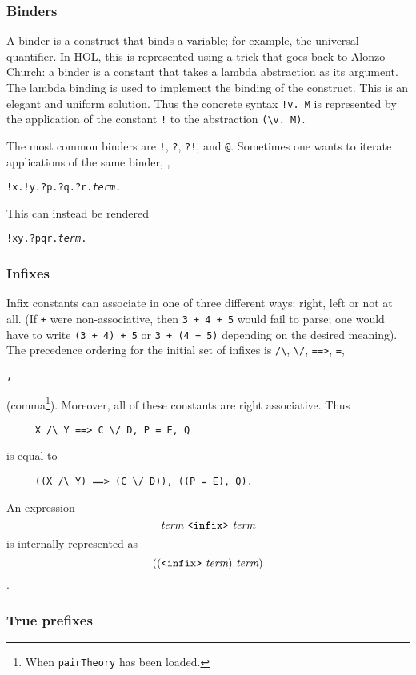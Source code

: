 \documentclass[12pt,fleqn,a4paper]{report}
\newcommand{\term}       {\mbox{\it term}}
\begin{document}
\subsubsection{Binders}

A binder is a construct that binds a variable; for example, the
universal quantifier. In HOL, this is represented using a trick that
goes back to Alonzo Church: a binder is a constant that takes a lambda
abstraction as its argument. The lambda binding is used to implement
the binding of the construct. This is an elegant and uniform solution.
Thus the concrete syntax \verb+!v. M+ is represented by the
application of the constant \verb+!+ to the abstraction \verb+(\v. M)+.

The most common binders are \verb+!+, \verb+?+, \verb+?!+, and
\verb+@+. Sometimes one wants to iterate applications of the same
binder, \eg,
\begin{alltt}
  !x. !y. ?p. ?q. ?r. \term.
\end{alltt}
This can instead be rendered
\begin{alltt}
  !x y. ?p q r. \term.
\end{alltt}

\subsubsection{Infixes}

Infix constants can associate in one of three different ways: right,
left or not at all.  (If \verb-+- were non-associative, then {\tt 3 +
  4 + 5} would fail to parse; one would have to write {\tt (3 + 4) +
  5} or {\tt 3 + (4 + 5)} depending on the desired meaning).  The
precedence ordering for the initial set of infixes is \verb+/\+,
\verb+\/+, \verb+==>+, \verb+=+,
 \begin{Large}\verb+,+\end{Large} (comma\footnote{When {\tt pairTheory} has
   been loaded.}). Moreover, all of these constants are right
 associative. Thus
\begin{verbatim}
     X /\ Y ==> C \/ D, P = E, Q
\end{verbatim}
 is equal to
\begin{verbatim}
     ((X /\ Y) ==> (C \/ D)), ((P = E), Q).
\end{verbatim}

\noindent An expression \[\term\ \verb+<infix>+\ \term\] is internally
represented as \[((\verb+<infix>+\ \term)\ \term)\].

\subsubsection{True prefixes}
\end{document}

